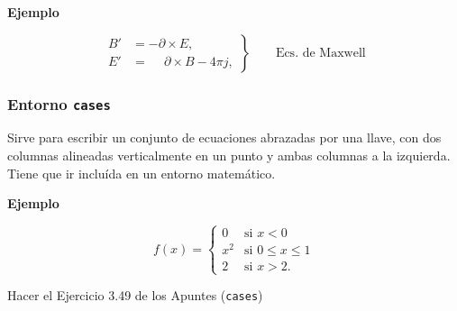 \documentclass[11pt,a4paper]{report}
\begin{document}
\bigskip
\textbf{Ejemplo}

\begin{equation*}
\left.
\begin{aligned}
B'& = -\partial\times E, \\
E'& = \phantom{-} \partial \times B - 4\pi j,
\end{aligned}
\right\}
\quad \quad \text{Ecs. de Maxwell}
\end{equation*}

\bigskip





\subsubsection{Entorno \texttt{cases}}





Sirve para escribir un conjunto de ecuaciones abrazadas por una llave, con dos columnas alineadas verticalmente en un punto y ambas columnas  a la izquierda. 
Tiene que ir incluída en un entorno matemático.





\bigskip
\textbf{Ejemplo}

\begin{equation}
f(x)=
\begin{cases}
0   & \text{si } x<0\\
x^2 & \text{si } 0 \leq x \leq 1 \\
2   & \text{si } x>2.
\end{cases}
\end{equation}

\bigskip





\bigskip
 Hacer el Ejercicio 3.49 de los Apuntes 
(\texttt{cases})
\end{document}

